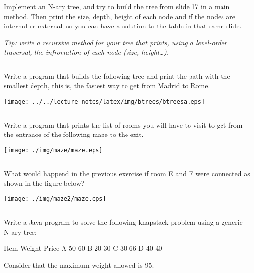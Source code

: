 \documentclass[a4paper, 11pt]{article}
\begin{document}
Implement an N-ary tree, and try to build the tree from slide 17 in a main
method. Then print the size, depth, height of each node and if the nodes are
internal or external, so you can have a solution to the table in that same slide.

\textsl{Tip: write a recursive method for your tree that prints, using a
level-order traversal, the infromation of each node (size, height\dots).}

\subsection{}

Write a program that builds the following tree and print the path with the
smallest depth, this is, the fastest way to get from Madrid to Rome.

\begin{center}
  \texttt{[image: ../../lecture-notes/latex/img/btrees/btreesa.eps]}
\end{center}

\subsection{}

Write a program that prints the list of rooms you will have to visit to get from the entrance of the following maze to the exit.

\begin{center}
  \texttt{[image: ./img/maze/maze.eps]}
\end{center}


\subsection{}

What would happend in the previous exercise if room E and F were connected as shown in the figure below?

\begin{center}
  \texttt{[image: ./img/maze2/maze.eps]}
\end{center}

\subsection{}

Write a Java program to solve the following knapstack problem using a generic N-ary tree:

\begin{blackboard}
Item  Weight  Price
A     50      60
B     20      30
C     30      66
D     40      40
\end{blackboard}

Consider that the maximum weight allowed is 95.
\end{document}
